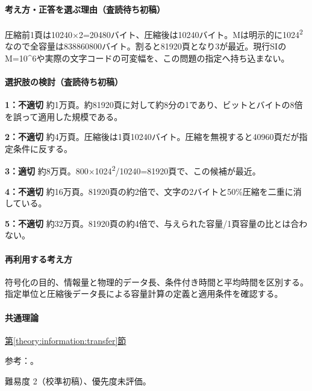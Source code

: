 \paragraph{考え方・正答を選ぶ理由（査読待ち初稿）} 圧縮前1頁は10240×2=\allowbreak{}20480バイト、圧縮後は10240バイト。Mは明示的に1024\textsuperscript{2}なので全容量は838860800バイト。割ると81920頁となり3が最近。現行SIのM=\allowbreak{}10\textasciicircum{}6や実際の文字コードの可変幅を、この問題の指定へ持ち込まない。

\paragraph{選択肢の検討（査読待ち初稿）}\mbox{}\par

\noindent\textbf{1：不適切} 約1万頁。約81920頁に対して約8分の1であり、ビットとバイトの8倍を誤って適用した規模である。\par

\noindent\textbf{2：不適切} 約4万頁。圧縮後は1頁10240バイト。圧縮を無視すると40960頁だが指定条件に反する。\par

\noindent\textbf{3：適切} 約8万頁。800×1024\textsuperscript{2}/10240=\allowbreak{}81920頁で、この候補が最近。\par

\noindent\textbf{4：不適切} 約16万頁。81920頁の約2倍で、文字の2バイトと50\%圧縮を二重に消している。\par

\noindent\textbf{5：不適切} 約32万頁。81920頁の約4倍で、与えられた容量/1頁容量の比とは合わない。\par

\paragraph{再利用する考え方} 符号化の目的、情報量と物理的データ長、条件付き時間と平均時間を区別する。指定単位と圧縮後データ長による容量計算の定義と適用条件を確認する。

\paragraph{共通理論} \hyperref[theory:information:transfer]{第\ref*{theory:information:transfer}節}

\par 参考：\cite{info_deflate}。

\par 難易度 2（校準初稿）、優先度未評価。

